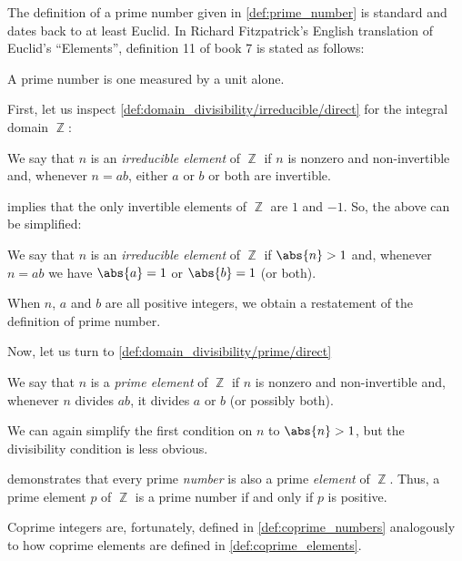 \begin{remark}\label{rem:prime_numbers_and_prime_elements}
  The definition of a prime number given in \cref{def:prime_number} is standard and dates back to at least Euclid. In Richard Fitzpatrick's English translation \cite[194]{Euclid2008Elements} of Euclid's \enquote{Elements}, definition 11 of book 7 is stated as follows:
  \begin{displayquote}
    A prime number is one measured by a unit alone.
  \end{displayquote}

  \begin{thmenum}
     First, let us inspect \cref{def:domain_divisibility/irreducible/direct} for the integral domain \( \BbbZ \):
    \begin{displayquote}
      We say that \( n \) is an \emph{irreducible element} of \( \BbbZ \) if \( n \) is nonzero and non-invertible and, whenever \( n = ab \), either \( a \) or \( b \) or both are invertible.
    \end{displayquote}

     implies that the only invertible elements of \( \BbbZ \) are \( 1 \) and \( -1 \). So, the above can be simplified:
    \begin{displayquote}
      We say that \( n \) is an \emph{irreducible element} of \( \BbbZ \) if \( \abs{n} > 1 \) and, whenever \( n = ab \) we have \( \abs{a} = 1 \) or \( \abs{b} = 1 \) (or both).
    \end{displayquote}

    When \( n \), \( a \) and \( b \) are all positive integers, we obtain a restatement of the definition of prime number.

     Now, let us turn to \cref{def:domain_divisibility/prime/direct}
    \begin{displayquote}
      We say that \( n \) is a \emph{prime element} of \( \BbbZ \) if \( n \) is nonzero and non-invertible and, whenever \( n \) divides \( ab \), it divides \( a \) or \( b \) (or possibly both).
    \end{displayquote}

    We can again simplify the first condition on \( n \) to \( \abs{n} > 1 \), but the divisibility condition is less obvious.

     demonstrates that every prime \emph{number} is also a prime \emph{element} of \( \BbbZ \). Thus, a prime element \( p \) of \( \BbbZ \) is a prime number if and only if \( p \) is positive.
  \end{thmenum}
\end{remark}
\begin{comments}
  \item Coprime integers are, fortunately, defined in \cref{def:coprime_numbers} analogously to how coprime elements are defined in \cref{def:coprime_elements}.
\end{comments}

